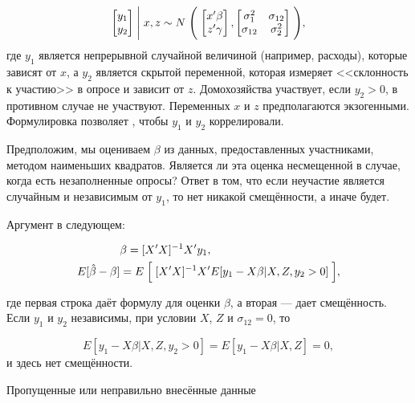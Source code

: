 \begin{equation}
\begin{bmatrix} y_{1} \\ y_{2} \end{bmatrix} \Biggm| x,z \sim N \Biggm( \begin{bmatrix} x'\beta \\ z'\gamma \end{bmatrix}, \begin{bmatrix} \sigma^2_{1} & \sigma_{12} \\ \sigma_{12} &  \sigma^2_{2}\end{bmatrix}\Biggm),
\end{equation}
где $y_{1}$ является непрерывной случайной величиной (например, расходы), которые зависят от $x$, а $y_{2}$ является скрытой переменной, которая измеряет <<склонность к участию>> в опросе и зависит от $z$. Домохозяйства участвует, если $y_{2}>0$, в противном случае не участвуют. Переменных $x$ и $z$ предполагаются экзогенными. Формулировка позволяет , чтобы $y_{1}$ и $y_{2}$  коррелировали. 


Предположим, мы оцениваем $\beta$ из данных, предоставленных участниками, методом наименьших квадратов. Является ли эта оценка несмещенной в случае, когда есть незаполненные опросы? Ответ в том, что если неучастие является случайным и независимым от $y_{1}$, то нет никакой смещённости, а иначе будет.

Аргумент в следующем:

\[
\begin{aligned}
&{\beta}=[X'X]^{-1}X'y_{1}, \\
E[\hat{\beta}-\beta]&=E\Bigm[ [X'X]^{-1}X'E[y_{1}-X\beta|X,Z,y_{2}>0] \Bigm],
\end{aligned}
\]

где первая строка даёт формулу для оценки $\beta$, а вторая --- дает смещённость. Если $y_{1}$ и $y_{2}$ независимы, при условии $X$, $Z$ и $\sigma_{12}=0$, то

\[
E[y_{1}-X\beta|X,Z,y_{2}>0]=E[y_{1}-X\beta|X,Z]=0,
\]
и здесь нет смещённости.

\begin{center}
Пропущенные или неправильно внесённые данные
\end{center}

